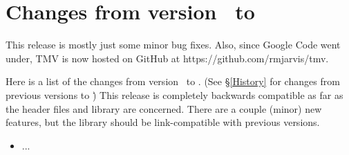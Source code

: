 
\section{Changes from version \prevtmvversion\ to \tmvversion}
\label{Changes}

This release is mostly just some minor bug fixes.  Also, since Google Code went under,
TMV is now hosted on GitHub at https://github.com/rmjarvis/tmv.

Here is a list of the changes from version \prevtmvversion\ to \tmvversion.  
(See \S\ref{History} for changes from previous versions to \prevtmvversion\.)
This release is completely backwards compatible as far as the header files and library are 
concerned.  There are a couple (minor) new features, but the library should be link-compatible
with previous versions.

\begin{itemize}

\item ...

\end{itemize}
